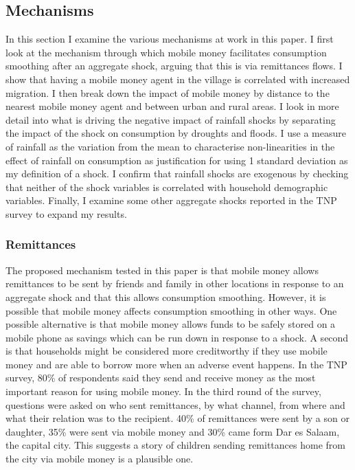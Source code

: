 \subsection{Mechanisms}
In this section I examine the various mechanisms at work in this paper. I first look at the mechanism through which mobile money facilitates consumption smoothing after an aggregate shock, arguing that this is via remittances flows. I show that having a mobile money agent in the village is correlated with increased migration. I then break down the impact of mobile money by distance to the nearest mobile money agent and between urban and rural areas. I look in more detail into what is driving the negative impact of rainfall shocks by separating the impact of the shock on consumption by droughts and floods. I use a measure of rainfall as the variation from the mean to characterise non-linearities in the effect of rainfall on consumption as justification for using 1 standard deviation as my definition of a shock. I confirm that rainfall shocks are exogenous by checking that neither of the shock variables is correlated with household demographic variables. Finally, I examine some other aggregate shocks reported in the TNP survey to expand my results.  

\subsubsection{Remittances}
The proposed mechanism tested in this paper is that mobile money allows remittances to be sent by friends and family in other locations in response to an aggregate shock and that this allows consumption smoothing. However, it is possible that mobile money affects consumption smoothing in other ways. One possible alternative is that mobile money allows funds to be safely stored on a mobile phone as savings which can be run down in response to a shock. A second is that households might be considered more creditworthy if they use mobile money and are able to borrow more when an adverse event happens. In the TNP survey, 80\% of respondents said they send and receive money as the most important reason for using mobile money. In the third round of the survey, questions were asked on who sent remittances, by what channel, from where and what their relation was to the recipient. 40\% of remittances were sent by a son or daughter, 35\% were sent via mobile money and 30\% came form Dar es Salaam, the capital city. This suggests a story of children sending remittances home from the city via mobile money is a plausible one.  

